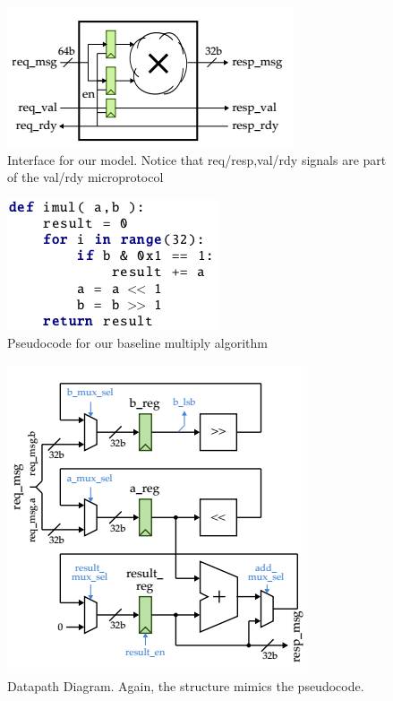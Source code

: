 \documentclass[11pt]{article}
\begin{document}
\begin{figure}[b]
\centering
\includegraphics[scale=0.5]{FLmodel}
\caption{Interface for our model. Notice that req/resp,val/rdy signals are part of the val/rdy microprotocol}
\label{fig:model}
\end{figure}

\begin{figure}[b]
\centering
\includegraphics[scale=0.9]{imul}
\caption{Pseudocode for our baseline multiply algorithm}
\label{fig:code}
\end{figure}

\begin{figure}[b]
\centering
\includegraphics[scale=0.6]{Datapath}
\caption{Datapath Diagram. Again, the structure mimics the pseudocode.}
\label{fig:datapath}
\end{figure}
\end{document}
